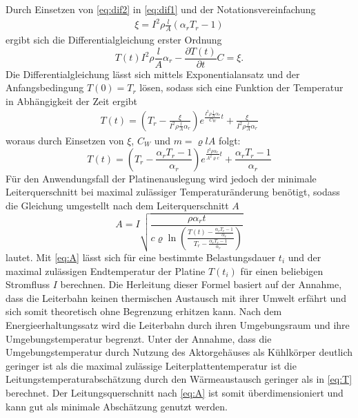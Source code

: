 Durch Einsetzen von \autoref{eq:dif2} in \autoref{eq:dif1} und der Notationsvereinfachung
\begin{align*}
\xi = I^2 \rho \frac{l}{A}(\alpha_r T_r-1)
\end{align*}
ergibt sich die Differentialgleichung erster Ordnung
\begin{equation}
\label{eq:dT}
T(t)I^2 \rho \frac{l}{A} \alpha_r-\frac{\partial T(t)}{\partial t}C = \xi .
\end{equation}
Die Differentialgleichung lässt sich mittels Exponentialansatz und der Anfangsbedingung $T(0) = T_r$ lösen, sodass sich eine Funktion der Temperatur in Abhängigkeit der Zeit ergibt
\begin{align*}
T(t) = \left(T_r-\frac{\xi}{I^2 \rho \frac{l}{A} \alpha_r}\right)e^{\frac{I^2\rho \frac{l}{A}\alpha_r}{C_W}t}+\frac{\xi}{I^2\rho \frac{l}{A}\alpha_r}
\end{align*}
woraus durch Einsetzen von $\xi$, $C_W$ und $m = \varrho l A$ folgt:
\begin{equation}
\label{eq:T}
T(t) = \left(T_r-\frac{\alpha_rT_r-1}{\alpha_r}\right)e^{\frac{I^2\rho\alpha_r}{A^2\varrho c}t}+\frac{\alpha_r T_r-1}{\alpha_r}
\end{equation}
Für den Anwendungsfall der Platinenauslegung wird jedoch der minimale Leiterquerschnitt bei maximal zulässiger Temperaturänderung benötigt, sodass die Gleichung umgestellt nach dem Leiterquerschnitt $A$
\begin{equation}
\label{eq:A}
A = I\sqrt{\frac{\rho\alpha_r t}{c\varrho \ln{\left(\frac{T(t)-\frac{\alpha_rT_r-1}{\alpha_r}}{T_r-\frac{\alpha_rT_r-1}{\alpha_r}}\right)}}}
\end{equation}
lautet. Mit \autoref{eq:A} lässt sich für eine bestimmte Belastungsdauer $t_i$ und der maximal zulässigen Endtemperatur der Platine $T(t_i)$ für einen beliebigen Stromfluss $I$ berechnen. Die Herleitung dieser Formel basiert auf der Annahme, dass die Leiterbahn keinen thermischen Austausch mit ihrer Umwelt erfährt und sich somit theoretisch ohne Begrenzung erhitzen kann. Nach dem Energieerhaltungssatz wird die Leiterbahn durch ihren Umgebungsraum und ihre Umgebungstemperatur begrenzt. Unter der Annahme, dass die Umgebungstemperatur durch Nutzung des Aktorgehäuses als Kühlkörper deutlich geringer ist als die maximal zulässige Leiterplattentemperatur ist die Leitungstemperaturabschätzung durch den Wärmeaustausch geringer als in \autoref{eq:T} berechnet. Der Leitungsquerschnitt nach \autoref{eq:A} ist somit überdimensioniert und kann gut als minimale Abschätzung genutzt werden.

